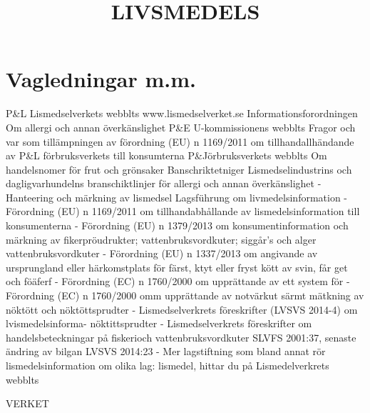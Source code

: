 \section*{Vagledningar m.m.}
P\&L Lismedselverkets webblts www.lismedselverket.se Informationsforordningen
Om allergi och annan överkänslighet
P\&E U-kommissionens webblts
Fragor och var som tillämpningen av förordning (EU) n 1169/2011 om tillhandallhändande av
P\&L förbruksverkets till konsumterna
P\&Jörbruksverkets webblts
Om handelsnomer för frut och grönsaker
Banschriktetniger
Lismedselindustrins och dagligvarhundelns branschiktlinjer för allergi och annan överkänslighet - Hanteering och märkning av lismedsel
Lagsführung om livmedelsinformation
- Förordning (EU) n 1169/2011 om tillhandabhållande av
lismedelsinformation till konsumenterna
- Förordning (EU) n 1379/2013 om konsumentinformation och
märkning av fikerpröudrukter; vattenbruksvordkuter; siggår's och alger
vattenbruksvordkuter
- Förordning (EU) n 1337/2013 om angivande av ursprungland eller
härkomstplats för färst, ktyt eller fryst kött av svin, får get och föäferf
- Förordning (EC) n 1760/2000 om upprättande av ett system för
- Förordning (EC) n 1760/2000 omm upprättande av notvärkut särmt mätkning av nöktött och nöktöttsprudter
- Lismedselverkrets föreskrifter (LVSVS 2014-4) om lvismedelsinforma-
nöktittsprudter
- Lismedselverkrets föreskrifter om handelsbeteckningar på fiskerioch vattenbruksvordkuter SLVFS 2001:37, senaste ändring av bilgan LVSVS 2014:23
- Mer lagstiftning som bland annat rör lismedelsinformation om olika lag: lismedel, hittar du på Lismedelverkrets webblts

\title{
LIVSMEDELS
} VERKET